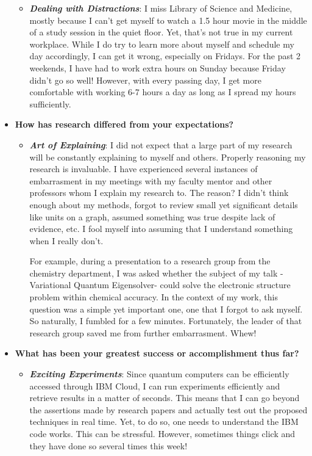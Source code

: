 \documentclass{article}
\newcommand{\s}{\item[]}
\begin{document}
\begin{itemize}
\begin{itemize}
  \s \textit{\textbf{Dealing with Distractions}}: I miss Library of Science
  and Medicine, mostly because I can't get myself to watch a 1.5 hour movie
  in the middle of a study session in the quiet floor. Yet, that's not true in
  my current workplace. While I do try to learn more about myself and schedule
  my day accordingly, I can get it wrong, especially on Fridays. For the past
  2 weekends, I have had to work extra hours on Sunday because Friday didn't
  go so well! However, with every passing day, I get more comfortable with working
  6-7 hours a day as long as I spread my hours sufficiently.
\end{itemize}

 \item \textbf{How has research differed from your expectations?}
 \begin{itemize}
   \s \textit{\textbf{Art of Explaining}}: I did not expect that a large part
   of my research will be constantly explaining to myself and others.
    Properly reasoning my research is invaluable. I have experienced
   several instances of embarrasment in my meetings with my faculty
   mentor and other professors whom I explain my research to. The reason? I
   didn't think enough about my methods, forgot to review small yet significant
   details like units on a graph, assumed something was true despite lack of
   evidence, etc. I fool myself into assuming that I understand something when
   I really don't.

   For example, during a presentation to a research group from the chemistry
   department, I was asked whether the subject of my talk -Variational
   Quantum Eigensolver- could solve the electronic structure problem
   within chemical accuracy. In the context of my work, this question was a simple
   yet important one, one that I forgot to ask myself. So naturally,
   I fumbled for a few minutes. Fortunately, the leader
   of that research group saved me from further embarrasment. Whew!
 \end{itemize}
\item \textbf{What has been your greatest success or accomplishment thus far?}
\begin{itemize}
  \s \textit{\textbf{Exciting Experiments}}: Since quantum computers can
  be efficiently accessed through IBM Cloud, I can run experiments efficiently
  and retrieve results in a matter of seconds. This means that I can go
  beyond the assertions made by research papers and actually test out the
  proposed techniques in real time. Yet, to do so, one needs to understand
  the IBM code works. This can be stressful. However, sometimes things click
  and they have done so several times this week!



\end{itemize}
\end{itemize}
\end{document}
